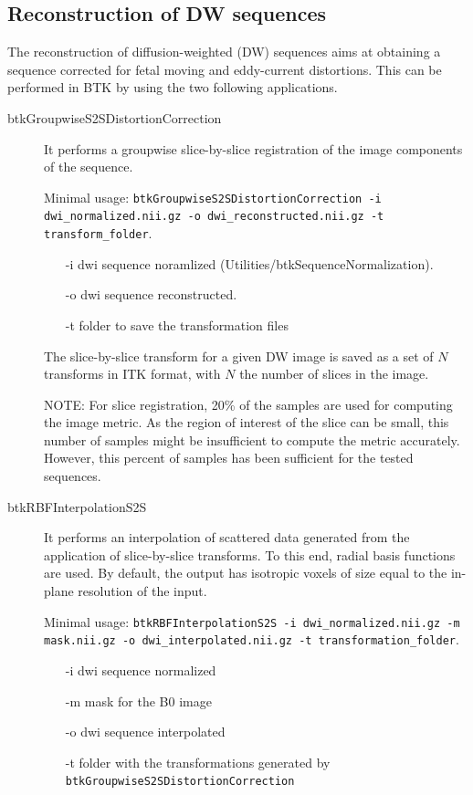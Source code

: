 \subsection{Reconstruction of DW sequences \cite{oubel_reconstruction_2010}}
\label{subsec:diff_rec}
The reconstruction of diffusion-weighted (DW) sequences aims at
obtaining a sequence corrected for fetal moving and eddy-current distortions.
This can be performed in BTK by using the two following applications. 
\begin{description}
\item[btkGroupwiseS2SDistortionCorrection] It performs a groupwise
slice-by-slice registration of the image components of the sequence.

Minimal usage: \texttt{btkGroupwiseS2SDistortionCorrection -i dwi\_normalized.nii.gz -o dwi\_reconstructed.nii.gz -t transform\_folder}.

\begin{itemize}
 \item[-i] dwi sequence noramlized (Utilities/btkSequenceNormalization).
 \item[-o] dwi sequence reconstructed.
 \item[-t] folder to save the transformation files
\end{itemize}

The slice-by-slice transform for a given DW image is saved as a set of $N$
transforms in ITK format, with $N$ the number of slices in the image.

NOTE: For slice registration, 20\% of the samples are used for computing the
image metric. As the region of interest of the slice can be small, this number
of samples might be insufficient to compute the metric accurately. However,
this percent of samples has been sufficient for the tested sequences. 

\item[btkRBFInterpolationS2S] It performs an interpolation of scattered data
generated from the application of slice-by-slice transforms. To this end,
radial basis functions are used. By default, the output has isotropic
voxels of size equal to the in-plane resolution of the input.

Minimal usage: \texttt{btkRBFInterpolationS2S -i dwi\_normalized.nii.gz -m mask.nii.gz -o dwi\_interpolated.nii.gz
-t transformation\_folder}.

\begin{itemize}
 \item[-i] dwi sequence normalized
 \item[-m] mask for the B0 image
 \item[-o] dwi sequence interpolated 
 \item[-t] folder with the transformations generated by
\texttt{btkGroupwiseS2SDistortionCorrection}
\end{itemize}

\end{description}


